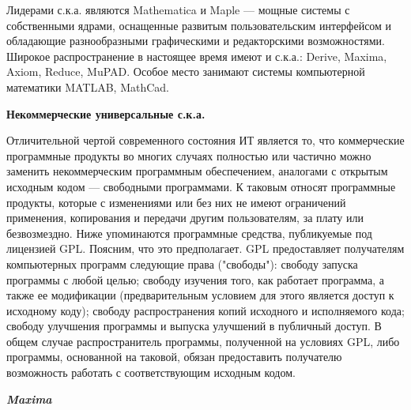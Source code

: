Лидерами с.к.а. являются Mathematica и Maple --- мощные системы с собственными ядрами, оснащенные развитым пользовательским интерфейсом и обладающие разнообразными графическими и редакторскими возможностями. Широкое распространение в настоящее время имеют и с.к.а.: Derive, Maxima, Axiom, Reduce, MuPAD. Особое место занимают системы компьютерной математики MATLAB, MathCad.

\textbf{Некоммерческие универсальные с.к.а.}

Отличительной чертой современного состояния ИТ является то, что коммерческие программные продукты во многих случаях полностью или частично можно заменить некоммерческим программным обеспечением, аналогами с открытым исходным кодом --- свободными программами. К таковым относят программные продукты, которые с изменениями или без них не имеют ограничений применения, копирования и передачи другим пользователям, за плату или безвозмездно. Ниже упоминаются программные средства, публикуемые под лицензией GPL. Поясним, что это предполагает. GPL предоставляет получателям компьютерных программ следующие права ("свободы"{}): свободу запуска программы с любой целью; свободу изучения того, как работает программа, а также ее модификации (предварительным условием для этого является доступ к исходному коду); свободу распространения копий исходного и исполняемого кода; свободу улучшения программы и выпуска улучшений в публичный доступ. В общем случае распространитель программы, полученной на условиях GPL, либо программы, основанной на таковой, обязан предоставить получателю возможность работать с соответствующим исходным кодом.

\textbf{\textit{Maxima}}

